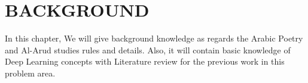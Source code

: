 
\chapter{\uppercase{Background}}\label{Ch:Background}
In this chapter, We will give background knowledge as regards the Arabic Poetry and Al-Arud studies rules and details. Also, it will contain basic knowledge of Deep Learning concepts with Literature review for the previous work in this problem area.







